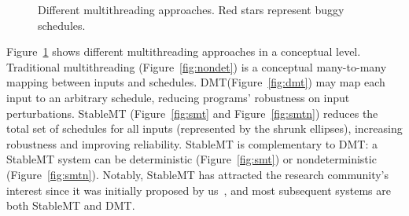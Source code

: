 \documentclass[10pt,onecolumn,letterpaper]{article}
\newcommand{\dmt}[0]{DMT\xspace}
\newcommand{\smt}[0]{StableMT\xspace}
\begin{document}
\begin{sloppypar}
\begin{figure}[ht]
\begin{center}
\vspace{-.05in}
\caption{Different multithreading approaches. Red stars represent buggy
schedules.}\label{fig:compare}
\vspace{-.2in}
\end{center}
\end{figure}

Figure~\ref{fig:compare} shows different multithreading 
approaches in a conceptual level. Traditional multithreading 
(Figure~\ref{fig:nondet}) is a conceptual many-to-many mapping between inputs 
and schedules.  \dmt (Figure~\ref{fig:dmt}) may map each input to an arbitrary 
schedule, reducing programs' robustness on input perturbations.  \smt 
(Figure~\ref{fig:smt} and Figure~\ref{fig:smtn}) reduces the total set of 
schedules for all inputs (represented by the shrunk ellipses), increasing 
robustness and improving reliability. \smt is complementary to \dmt: a \smt 
system can be deterministic (Figure~\ref{fig:smt}) or nondeterministic 
(Figure~\ref{fig:smtn}). Notably, StableMT has attracted the research 
community’s interest since it was 
initially proposed by us~\cite{cui:tern:osdi10}, and most subsequent systems 
are both StableMT and DMT.


\end{sloppypar}
\end{document}
